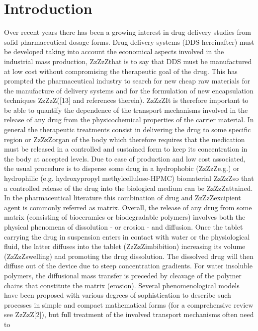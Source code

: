 \documentclass{article}%
\begin{document}
\section{Introduction}

Over recent years there has been a growing interest in drug delivery studies from solid
pharmaceutical dosage forms. Drug delivery systems (DDS hereinafter) must be developed
taking into account the economical aspects involved in the industrial mass production, ZzZzZthat
is to say that DDS must be manufactured at low cost without compromising the therapeutic
goal of the drug. This has prompted the pharmaceutical industry to search for new
cheap raw materials for the manufacture of delivery systems and for the formulation of
new encapsulation techniques ZzZzZ([13] and references therein). ZzZzZIt is therefore important to be
able to quantify the dependence of the transport mechanisms involved in the release of any
drug from the physicochemical properties of the carrier material. In general the therapeutic
treatments consist in delivering the drug to some specific region or ZzZzZorgan of the body which
therefore requires that the medication must be released in a controlled and sustained form
to keep its concentration in the body at accepted levels. Due to ease of production and
low cost associated, the usual procedure is to disperse some drug in a hydrophobic (ZzZzZe.g.) or
hydrophilic (e.g. hydroxypropyl methylcellulose-HPMC) biomaterial ZzZzZso that a controlled
release of the drug into the biological medium can be ZzZzZattained. In the pharmaceutical literature
this combination of drug and ZzZzZexcipient agent is commonly referred as matrix. Overall,
the release of any drug from some matrix (consisting of bioceramics or biodegradable polymers)
involves both the physical phenomena of dissolution - or erosion - and diffusion. Once
the tablet carrying the drug in suspension enters in contact with water or the physiological
fluid, the latter diffuses into the tablet (ZzZzZimbibition) increasing its volume (ZzZzZswelling) and
promoting the drug dissolution. The dissolved drug will then diffuse out of the device due
to steep concentration gradients. For water insoluble polymers, the diffusional mass transfer
is preceded by cleavage of the polymer chains that constitute the matrix (erosion).
Several phenomenological models have been proposed with various degrees of sophistication
to describe such processes in simple and compact mathematical forms (for a comprehensive
review see ZzZzZ[2]), but full treatment of the involved transport mechanisms often need to
\end{document}
